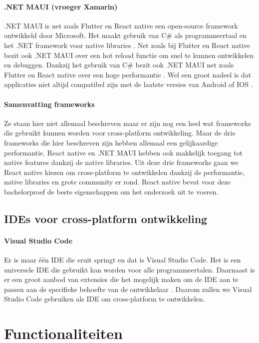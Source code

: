 \paragraph{.NET MAUI (vroeger Xamarin)}
.NET MAUI is net zoals Flutter en React native een open-source framework ontwikkeld door 
Microsoft. Het maakt gebruik van C\# als programmeertaal en het .NET framework voor 
native libraries \autocite{Sakovich22023}. Net zoals bij Flutter en React native bezit 
ook .NET MAUI over een hot reload functie om snel te kunnen ontwikkelen en debuggen. 
Dankzij het gebruik van C\# bezit ook .NET MAUI net zoals Flutter en React native over 
een hoge performantie \autocite{Okeke2022a}. Wel een groot nadeel is dat applicaties 
niet altijd compatibel zijn met de laatste versies van Android of IOS \autocite{Terekhov2022}.

\paragraph{Samenvatting frameworks}
Ze staan hier niet allemaal beschreven maar er zijn nog een heel wat frameworks die 
gebruikt kunnen worden voor cross-platform ontwikkeling. Maar de drie frameworks die 
hier beschreven zijn hebben allemaal een gelijkaardige performantie. React native en 
.NET MAUI hebben ook makkelijk toegang tot native features dankzij de native libraries. 
Uit deze drie frameworks gaan we React native kiezen om cross-platform te ontwikkelen 
dankzij de performantie, native libraries en grote community er rond. React native 
bevat voor deze bachelorproef de beste eigenschappen om het onderzoek uit te voeren.

\subsection{IDEs voor cross-platform ontwikkeling}

\paragraph{Visual Studio Code}
Er is maar één IDE die eruit springt en dat is Visual Studio Code. Het is een 
universele IDE die gebruikt kan worden voor alle programmeertalen. Daarnaast is er een 
groot aanbod van extensies die het mogelijk maken om de IDE aan te passen aan de 
specifieke behoefte van de ontwikkelaar \autocite{Heller2022}. Daarom zullen we Visual 
Studio Code gebruiken als IDE om cross-platform te ontwikkelen.

\section{Functionaliteiten}
